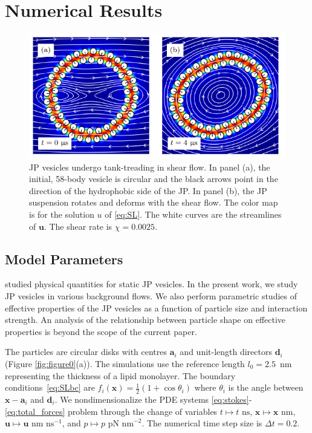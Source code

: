 \documentclass[lineno]{jfm}
\renewcommand{\aa}{\mathbf{a}}
\newcommand{\dd}{\mathbf{d}}
\newcommand{\xx}{\mathbf{x}}
\newcommand{\uu}{\mathbf{u}}
\begin{document}
\section{\label{results}Numerical Results}

\begin{figure}
\centering
\includegraphics[width=11.5cm]{Figure3_Wrapper.pdf}
  \caption{\label{figure3} 
  JP vesicles undergo tank-treading in shear flow. 
  In panel (a),  the initial, 58-body vesicle is circular and the black arrows point in the direction of the
  hydrophobic side of the JP.
  In panel (b), the JP suspension rotates and deforms with the shear flow.
  The color map is for the solution $u$ of \eqref{eq:SL}. 
  The white curves are the streamlines of $\uu.$ 
   The shear rate is $\chi=0.0025$.}
\end{figure}

\subsection{Model Parameters}
\cite{Fu20} studied physical quantities for static JP vesicles. 
In the present work, we study JP vesicles in various background flows.
We also perform parametric studies of effective properties of the JP vesicles 
as a function of particle size and interaction strength.
An analysis of the relationship between particle shape on effective properties is beyond 
the scope of the current paper. 

The particles are circular disks with centres 
$\aa_i$ and unit-length directors $\dd_i$ (Figure \ref{fig:figure0}(a)).
The simulations use the reference length $l_0 = 2.5$~nm representing the
thickness of a lipid monolayer.
The boundary conditions~\eqref{eq:SLbc} are $f_i(\xx) = \tfrac{1}{2}(1 + \cos
\theta_i)$ where $\theta_i$ is the angle between $\xx - \aa_i$ and
$\dd_i$.
We nondimensionalize the PDE systems 
\eqref{eq:stokes}-\eqref{eq:total_forces}
problem through the change of variables 
$t \mapsto t \text{ ns}$,
$\xx \mapsto \xx \text{ nm}$, %
$\uu \mapsto \uu \text{ nm ns}^{-1}$, and %
$p \mapsto p \text{ pN nm}^{-2}$.
The numerical time step size is $\Delta t=0.2$.
\end{document}
